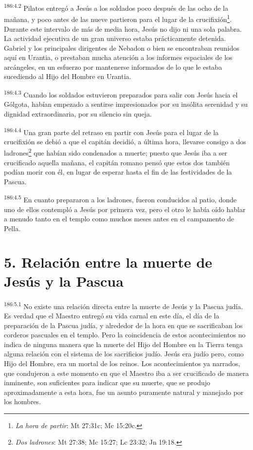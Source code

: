 \par 
\textsuperscript{186:4.2} Pilatos entregó a Jesús a los soldados poco después de las ocho de la mañana, y poco antes de las nueve partieron para el lugar de la crucifixión\footnote{\textit{La hora de partir}: Mt 27:31c; Mc 15:20c.}. Durante este intervalo de más de media hora, Jesús no dijo ni una sola palabra. La actividad ejecutiva de un gran universo estaba prácticamente detenida. Gabriel y los principales dirigentes de Nebadon o bien se encontraban reunidos aquí en Urantia, o prestaban mucha atención a los informes espaciales de los arcángeles, en un esfuerzo por mantenerse informados de lo que le estaba sucediendo al Hijo del Hombre en Urantia.

\par 
\textsuperscript{186:4.3} Cuando los soldados estuvieron preparados para salir con Jesús hacia el Gólgota, habían empezado a sentirse impresionados por su insólita serenidad y su dignidad extraordinaria, por su silencio sin queja.

\par 
\textsuperscript{186:4.4} Una gran parte del retraso en partir con Jesús para el lugar de la crucifixión se debió a que el capitán decidió, a última hora, llevarse consigo a dos ladrones\footnote{\textit{Dos ladrones}: Mt 27:38; Mc 15:27; Lc 23:32; Jn 19:18.} que habían sido condenados a muerte; puesto que Jesús iba a ser crucificado aquella mañana, el capitán romano pensó que estos dos también podían morir con él, en lugar de esperar hasta el fin de las festividades de la Pascua.

\par 
\textsuperscript{186:4.5} En cuanto prepararon a los ladrones, fueron conducidos al patio, donde uno de ellos contempló a Jesús por primera vez, pero el otro le había oído hablar a menudo tanto en el templo como muchos meses antes en el campamento de Pella.

\section*{5. Relación entre la muerte de Jesús y la Pascua}
\par 
\textsuperscript{186:5.1} No existe una relación directa entre la muerte de Jesús y la Pascua judía. Es verdad que el Maestro entregó su vida carnal en este día, el día de la preparación de la Pascua judía, y alrededor de la hora en que se sacrificaban los corderos pascuales en el templo. Pero la coincidencia de estos acontecimientos no indica de ninguna manera que la muerte del Hijo del Hombre en la Tierra tenga alguna relación con el sistema de los sacrificios judío. Jesús era judío pero, como Hijo del Hombre, era un mortal de los reinos. Los acontecimientos ya narrados, que condujeron a este momento en que el Maestro iba a ser crucificado de manera inminente, son suficientes para indicar que su muerte, que se produjo aproximadamente a esta hora, fue un asunto puramente natural y manejado por los hombres.

